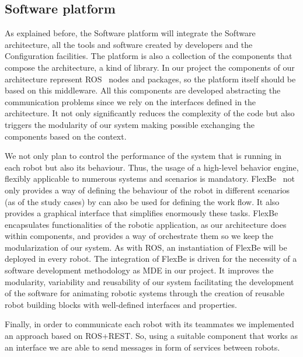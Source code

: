
\subsection{Software platform}

As explained before, the Software platform will integrate the Software architecture, all the tools and software created by developers and the Configuration facilities.
The platform is also a collection of the components that compose the architecture, a kind of library.
In our project the components of our architecture represent ROS~\cite{Quigley2009} nodes and packages, so the platform itself should be based on this middleware.
All this components are developed abstracting the communication problems since we rely on the interfaces defined in the architecture.
It not only significantly reduces the complexity of the code but also triggers the modularity of our system making possible exchanging the components based on the context.

We not only plan to control the performance of the system that is running in each robot but also its behaviour.
Thus, the usage of a high-level behavior engine, flexibly applicable to numerous systems and scenarios is mandatory.
FlexBe~\cite{Schillinger2016} not only provides a way of defining the behaviour of the robot in different scenarios (as of the study cases) by can also be used for defining the work flow.
It also provides a graphical interface that simplifies enormously these tasks.
FlexBe encapsulates functionalities of the robotic application, as our architecture does within components, and provides a way of orchestrate them so we keep the modularization of our system.
As with ROS, an instantiation of FlexBe will be deployed in every robot.
The integration of FlexBe is driven for the necessity of a software development methodology as MDE in our project.
It improves the modularity, variability and reusability of our system facilitating the development of the software for animating robotic systems through the creation of reusable robot building blocks with well-defined interfaces and properties.

Finally, in order to communicate each robot with its teammates we implemented an approach based on ROS+REST.
So, using a suitable component that works as an interface we are able to send messages in form of services between robots.

